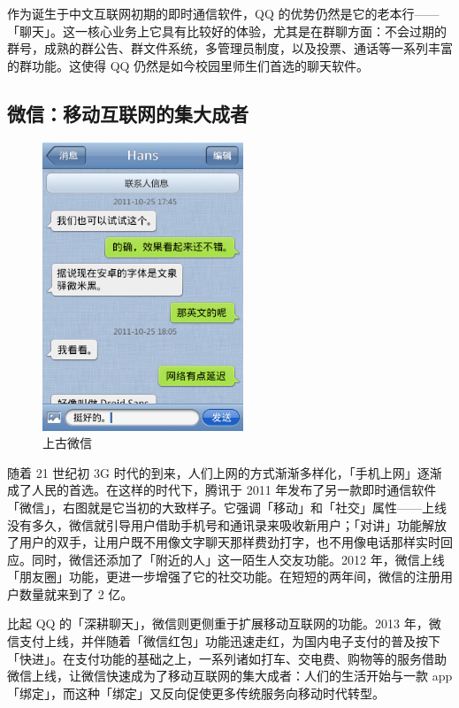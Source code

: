 作为诞生于中文互联网初期的即时通信软件，QQ 的优势仍然是它的老本行——「聊天」。这一核心业务上它具有比较好的体验，尤其是在群聊方面：不会过期的群号，成熟的群公告、群文件系统，多管理员制度，以及投票、通话等一系列丰富的群功能。这使得 QQ 仍然是如今校园里师生们首选的聊天软件。

\subsection{微信：移动互联网的集大成者}

\begin{figure}
  \centering
  \vspace*{-1.5ex}
  \includegraphics[width=6cm]{assets/software/Old_Wechat.png}
  \caption{上古微信}
  \label{fig:Old_Wechat}
\end{figure}

随着 21 世纪初 3G 时代的到来，人们上网的方式渐渐多样化，「手机上网」逐渐成了人民的首选。在这样的时代下，腾讯于 2011 年发布了另一款即时通信软件「微信」，右图就是它当初的大致样子。它强调「移动」和「社交」属性——上线没有多久，微信就引导用户借助手机号和通讯录来吸收新用户；「对讲」功能解放了用户的双手，让用户既不用像文字聊天那样费劲打字，也不用像电话那样实时回应。同时，微信还添加了「附近的人」这一陌生人交友功能。2012 年，微信上线「朋友圈」功能，更进一步增强了它的社交功能。在短短的两年间，微信的注册用户数量就来到了 2 亿。

比起 QQ 的「深耕聊天」，微信则更侧重于扩展移动互联网的功能。2013 年，微信支付上线，并伴随着「微信红包」功能迅速走红，为国内电子支付的普及按下「快进」。在支付功能的基础之上，一系列诸如打车、交电费、购物等的服务借助微信上线，让微信快速成为了移动互联网的集大成者：人们的生活开始与一款 app「绑定」，而这种「绑定」又反向促使更多传统服务向移动时代转型。

